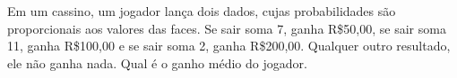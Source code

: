 %
%


\begin{exercicioBanco}[\valorquestao]
    Em um cassino, um jogador lança dois dados, cujas probabilidades são proporcionais aos valores das faces. Se sair soma 7, ganha R\$50,00, se sair soma 11, ganha R\$100,00 e se sair soma 2, ganha R\$200,00. Qualquer outro resultado, ele não ganha nada. Qual é o ganho médio do jogador.
\end{exercicioBanco}

